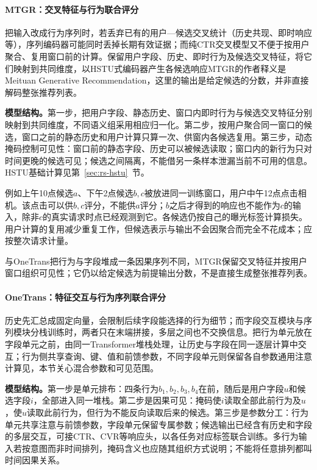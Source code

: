 \Needspace{110mm}
\paragraph{MTGR：交叉特征与行为联合评分}
\label{sec:rs-mtgr}

把输入改成行为序列时，若丢弃已有的用户—候选交叉统计（历史共现、即时响应等），序列编码器可能同时丢掉长期有效证据；而纯CTR交叉模型又不便于按用户聚合、复用窗口前的计算。保留用户字段、历史、即时行为及候选交叉特征，将它们映射到共同维度，以HSTU式编码器产生各候选响应MTGR的作者释义是Meituan Generative Recommendation，这里的输出是给定候选的分数，并非直接解码整张推荐列表。

\textbf{模型结构。}第一步，把用户字段、静态历史、窗口内即时行为与候选交叉特征分别映射到共同维度，不同语义组采用相应归一化。第二步，按用户聚合同一窗口的候选，窗口之前的静态历史和用户计算只算一次、供窗内各候选复用。第三步，动态掩码控制可见性：窗口前的静态字段、历史可以被候选读取；窗口内的新行为只对时间更晚的候选可见；候选之间隔离，不能借另一条样本泄漏当前不可用的信息。HSTU基础计算见第~\ref{sec:rs-hstu}~节。

例如上午10点候选$a$、下午2点候选$b,c$被放进同一训练窗口，用户中午12点点击相机。该点击可以供$b,c$评分，不能供$a$评分；$b$之后才得到的响应也不能作为$c$的输入，除非$c$的真实请求时点已经观测到它。各候选仍按自己的曝光标签计算损失。用户计算的复用减少重复工作，但候选表示与输出不会因聚合而完全不花成本；应按整次请求计量。

与OneTrans把行为与字段堆成一条因果序列不同，MTGR保留交叉特征并按用户窗口组织可见性；它仍以给定候选为前提输出分数，不是直接生成整张推荐列表。

\paragraph{OneTrans：特征交互与行为序列联合评分}
\label{sec:rs-onetrans}

历史先汇总成固定向量，会限制后续字段能选择的行为细节；而字段交互模块与序列模块分栈训练时，两者只在末端拼接，多层之间也不交换信息。把行为单元放在字段单元之前，由同一Transformer堆栈处理，让历史与字段在同一逐层计算中交互；行为侧共享查询、键、值和前馈参数，不同字段单元则保留各自参数通用注意计算见，本节关心混合参数和可见范围。

\textbf{模型结构。}第一步是单元排布：四条行为$b_1,b_2,b_3,b_4$在前，随后是用户字段$u$和候选字段$i$，全部进入同一堆栈。第二步是因果可见：掩码使$i$读取全部此前行为及$u$，使$u$读取此前行为，但行为不能反向读取后来的候选。第三步是参数分工：行为单元共享注意与前馈参数，字段单元保留专属参数；候选输出已经含有历史和字段的多层交互，可接CTR、CVR等响应头，以各任务对应标签联合训练。多行为输入若按意图而非时间排列，掩码含义也应随其组织方式说明；不能将任意排列都叫时间因果关系。

